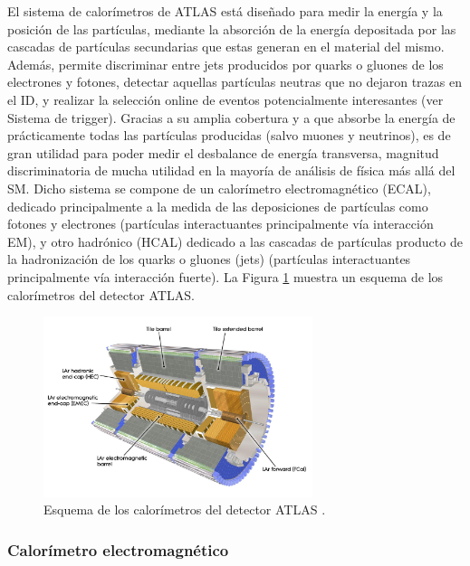 El sistema de calorímetros de ATLAS está diseñado para medir la energía y la posición de las partículas, mediante la absorción de la energía depositada por las cascadas de partículas secundarias que estas generan en el material del mismo. Además, permite discriminar entre jets producidos por quarks o gluones de los electrones y fotones, detectar aquellas partículas neutras que no dejaron trazas en el ID, y realizar la selección online de eventos potencialmente interesantes (ver Sistema de trigger). Gracias a su amplia cobertura y a que absorbe la energía de prácticamente todas las partículas producidas (salvo muones y neutrinos), es de gran utilidad para poder medir el desbalance de energía transversa, magnitud discriminatoria de mucha utilidad en la mayoría de análisis de física más allá del SM. Dicho sistema se compone de un calorímetro electromagnético (ECAL), dedicado principalmente a la medida de las deposiciones de partículas como fotones y electrones (partículas interactuantes principalmente vía interacción EM), y otro hadrónico (HCAL) dedicado a las cascadas de partículas producto de la hadronización de los quarks o gluones (jets) (partículas interactuantes principalmente vía interacción fuerte). La Figura \ref{fig:calo_1} muestra un esquema de los calorímetros del detector ATLAS.

\begin{figure}
\centering
  \includegraphics[width=0.7\textwidth]{images/lhc/calo_1.jpg}
  \caption{Esquema de los calorímetros del detector ATLAS \cite{Pequenao:1095927}.}
  \label{fig:calo_1}
\end{figure}

\subsubsection{Calorímetro electromagnético}

